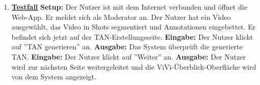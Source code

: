 \begin{enumerate}
	\item \underline{\textbf{Testfall}} \linebreak
	\textbf{Setup:} Der Nutzer ist mit dem Internet verbunden und öffnet die Web-App. Er meldet sich als Moderator an. Der Nutzer hat ein Video ausgewählt, das Video in Shots segmentiert und Annotationen eingebettet. Er befindet sich jetzt auf der TAN-Erstellungsseite.\linebreak
	\textbf{Eingabe:} Der Nutzer klickt auf ''TAN generieren'' an.\linebreak
	\textbf{Ausgabe:} Das System überprüft die generierte TAN.\linebreak
	\textbf{Eingabe:} Der Nutzer klickt auf ''Weiter'' an.\linebreak
	\textbf{Ausgabe:} Der Nutzer wird zur nächsten Seite weitergeleitet und die ViVi-Überblick-Oberfläche wird von dem System angezeigt.
	
\end{enumerate}
